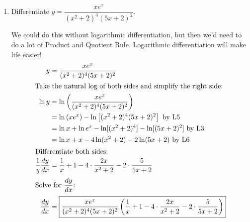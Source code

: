 \documentclass[main]{subfiles}
\begin{document}
\begin{enumerate}[resume]

  \item

    \begin{problem}[\stretch{1}]
      Differentiate $y = \dfrac{xe^x}{(x^2+2)^4(5x+2)^2}$.
    \end{problem}

    \begin{solution}
      We could do this without logarithmic differentiation, but then we'd
      need to do a lot of Product and Quotient Rule.  Logarithmic
      differentiation will make life easier!
      \begin{align*}
        y &= \frac{xe^x}{(x^2+2)^4 (5x+2)^2} \\
        \intertext{Take the natural log of both sides and simplify the
          right side:}
        \ln y &= \ln \left( \dfrac{xe^x}{(x^2+2)^4 (5x+2)^2} \right) \\
        &= \ln \left( xe^x \right) - \ln \left[ (x^2+2)^4 (5x+2)^2 \right]
        \text{ by {L5}} \\
        &= \ln x + \ln e^x - \ln [(x^2 + 2)^4] - \ln [(5x + 2)^2] \text{
          by {L3}} \\
        &= \ln x + x - 4 \ln (x^2 + 2) - 2 \ln(5x + 2) \text{ by
          {L6}} \\
        \intertext{Differentiate both sides:} \frac{1}{y} \frac{dy}{dx} &=
        \frac{1}{x} + 1- 4 \cdot
        \frac{2x}{x^2 + 2} - 2 \cdot \frac{5}{5x + 2} \\
        \intertext{Solve for $\dfrac{dy}{dx}$:} \frac{dy}{dx} &=
        \boxed{\frac{xe^x}{(x^2+2)^4 (5x+2)^2} \left( \frac{1}{x} + 1- 4
            \cdot \frac{2x}{x^2 + 2} - 2 \cdot \frac{5}{5x + 2} \right)}
      \end{align*}
    \end{solution}


\end{enumerate}
\end{document}

